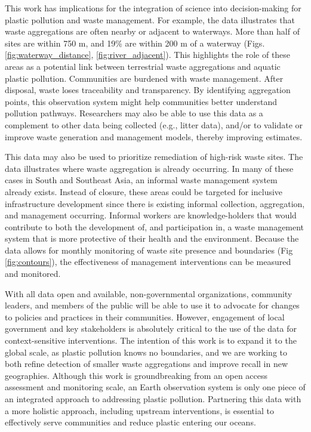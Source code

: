 \documentclass[10pt,letterpaper]{article}
\begin{document}
This work has implications for the integration of science into decision-making for plastic pollution and waste management. For example, the data illustrates that waste aggregations are often nearby or adjacent to waterways. More than half of sites are within 750 m, and 19\% are within 200 m of a waterway (Figs. \ref{fig:waterway_distance}, \ref{fig:river_adjacent}). This highlights the role of these areas as a potential link between terrestrial waste aggregations and aquatic plastic pollution. Communities are burdened with waste management. After disposal, waste loses traceability and transparency. By identifying aggregation points, this observation system might help communities better understand pollution pathways. Researchers may also be able to use this data as a complement to other data being collected (e.g., litter data), and/or to validate or improve waste generation and management models, thereby improving estimates.

This data may also be used to prioritize remediation of high-risk waste sites. The data illustrates where waste aggregation is already occurring. In many of these cases in South and Southeast Asia, an informal waste management system already exists. Instead of closure, these areas could be targeted for inclusive infrastructure development since there is existing informal collection, aggregation, and management occurring. Informal workers are knowledge-holders that would contribute to both the development of, and participation in, a waste management system that is more protective of their health and the environment. Because the data allows for monthly monitoring of waste site presence and boundaries (Fig \ref{fig:contours}), the effectiveness of management interventions can be measured and monitored.

With all data open and available, non-governmental organizations, community leaders, and members of the public will be able to use it to advocate for changes to policies and practices in their communities. However, engagement of local government and key stakeholders is absolutely critical to the use of the data for context-sensitive interventions. The intention of this work is to expand it to the global scale, as plastic pollution knows no boundaries, and we are working to both refine detection of smaller waste aggregations and improve recall in new geographies. Although this work is groundbreaking from an open access assessment and monitoring scale, an Earth observation system is only one piece of an integrated approach to addressing plastic pollution. Partnering this data with a more holistic approach, including upstream interventions, is essential to effectively serve communities and reduce plastic entering our oceans.
\end{document}
